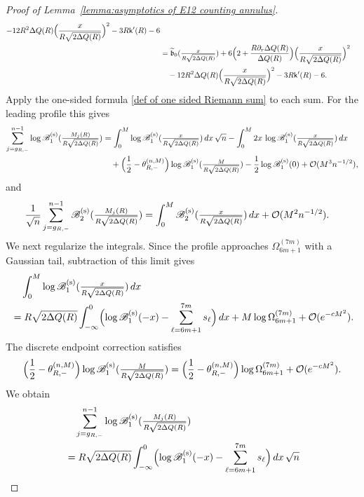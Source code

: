 \documentclass[a4paper]{article}
\numberwithin{equation}{section}
\begin{document}
\begin{proof}[Proof of Lemma~\ref{lemma:asymptotics of E12 counting annulus}]
\begin{align*}
-12R^2\Delta Q(R)
\Bigl(\frac{x}{R\sqrt{2\Delta Q(R)}}\Bigr)^2
-3R\mathsf{k}'(R)-6
\\
&=
\widetilde{\mathfrak{b}}_0(\tfrac{x}{R\sqrt{2\Delta Q(R)}})
+
6\Bigl(
2+\frac{R\partial_r\Delta Q(R)}{\Delta Q(R)}
\Bigr)
\Bigl(\frac{x}{R\sqrt{2\Delta Q(R)}}\Bigr)^2
\\
&\quad
-12R^2\Delta Q(R)
\Bigl(\frac{x}{R\sqrt{2\Delta Q(R)}}\Bigr)^2
-3R\mathsf{k}'(R)-6.
\end{align*}
Apply the one-sided formula \eqref{def of one sided Riemann sum} to each sum.
For the leading profile this gives
\begin{align*}
\sum_{j=g_{R,-}}^{n-1}\log\mathscr{B}_1^{(\rm s)}(\tfrac{M_j(R)}{R\sqrt{2\Delta Q(R)}})
&=
\int_0^{M}\log\mathscr{B}_1^{(\rm s)}(\tfrac{x}{R\sqrt{2\Delta Q(R)}})\,dx\,\sqrt{n}
-\int_0^{M}2x\,\log\mathscr{B}_1^{(\rm s)}(\tfrac{x}{R\sqrt{2\Delta Q(R)}})\,dx
\\
&\quad 
+\Bigl(\frac{1}{2}-\theta_{R,-}^{(n,M)}\Bigr)
\log\mathscr{B}_1^{(\rm s)}(\tfrac{M}{R\sqrt{2\Delta Q(R)}})
-\frac{1}{2}
\log\mathscr{B}_1^{(\rm s)}(0)
+\mathcal{O}(M^3n^{-1/2}),  
\end{align*}
and 
\begin{align*}
\frac{1}{\sqrt{n}}\sum_{j=g_{R,-}}^{n-1}
\mathscr{B}_{2}^{(\rm s)}(\tfrac{M_j(R)}{R\sqrt{2\Delta Q(R)}})    
&=    
\int_0^{M}\mathscr{B}_2^{(\rm s)}(\tfrac{x}{R\sqrt{2\Delta Q(R)}})\,dx
+
\mathcal{O}(M^2n^{-1/2}). 
\end{align*}
We next regularize the integrals.  Since the profile approaches
$\Omega_{6m+1}^{(7m)}$ with a Gaussian tail, subtraction of this limit gives
\begin{align*}
&\quad \int_0^{M}\log\mathscr{B}_1^{(\rm s)}(\tfrac{x}{R\sqrt{2\Delta Q(R)}})\,dx
\\
&=R\sqrt{2\Delta Q(R)}\int_{-\infty}^{0}\Bigl(
\log\mathscr{B}_{1}^{(\rm s)}(-x) -\sum_{\ell=6m+1}^{7m}s_{\ell}\Bigr)\,dx
+M\log\Omega_{6m+1}^{(7m)}+\mathcal O(e^{-cM^2}).
\end{align*}
The discrete endpoint correction satisfies
\[
\Bigl(\frac{1}{2}-\theta_{R,-}^{(n,M)}\Bigr)
\log\mathscr{B}_1^{(\rm s)}(\tfrac{M}{R\sqrt{2\Delta Q(R)}})
=
\Bigl(\frac{1}{2}-\theta_{R,-}^{(n,M)}\Bigr)\log\Omega_{6m+1}^{(7m)}+\mathcal{O}(e^{-cM^2}).
\]
We obtain 
\begin{align*}
&\quad \sum_{j=g_{R,-}}^{n-1}\log\mathscr{B}_1^{(\rm s)}(\tfrac{M_j(R)}{R\sqrt{2\Delta Q(R)}})
\\
&=    
R\sqrt{2\Delta Q(R)}\int_{-\infty}^{0}\Bigl(
\log\mathscr{B}_{1}^{(\rm s)}(-x) -\sum_{\ell=6m+1}^{7m}s_{\ell}\Bigr)\,dx\,\sqrt{n}

\end{align*}
\end{proof}
\end{document}
